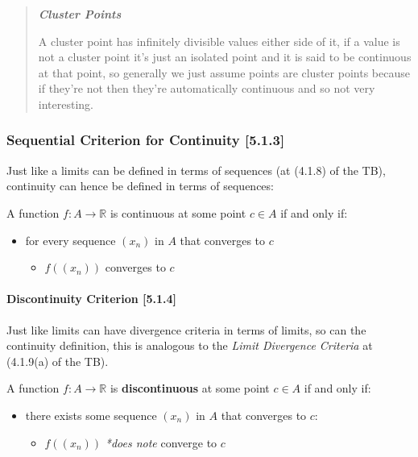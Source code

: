 \documentclass[class=article, crop=false]{standalone}
\begin{document}
\begin{quote}
\textbf{\emph{Cluster Points}}

A cluster point has infinitely divisible values either side of it, if a
value is not a cluster point it's just an isolated point and it is said
to be continuous at that point, so generally we just assume points are
cluster points because if they're not then they're automatically
continuous and so not very interesting.
\end{quote}

\hypertarget{header-n3914}{%
\subsubsection{Sequential Criterion for Continuity
{[}5.1.3{]}}\label{header-n3914}}

Just like a limits can be defined in terms of sequences (at (4.1.8) of
the TB), continuity can hence be defined in terms of sequences:

A function \(f: A \rightarrow \mathbb{R}\) is continuous at some point
\(c \in A \) if and only if:

\begin{itemize}
\item
  for every sequence \((x_n)\) in \(A\) that converges to \(c\)

  \begin{itemize}
  \item
    \(f\left(\left( x_n \right) \right)\) converges to \(c\) 
  \end{itemize}
\end{itemize}

\hypertarget{header-n3923}{%
\paragraph{Discontinuity Criterion {[}5.1.4{]}}\label{header-n3923}}

Just like limits can have divergence criteria in terms of limits, so can
the continuity definition, this is analogous to the \emph{Limit
Divergence Criteria} at (4.1.9(a) of the TB).

A function \(f: A \rightarrow \mathbb{R}\) is \textbf{discontinuous} at
some point \(c \in A \) if and only if:

\begin{itemize}
\item
  there exists some sequence \((x_n)\) in \(A\) that converges to \(c\):

  \begin{itemize}
  \item
    \(f\left(\left( x_n \right) \right)\) \emph{*does note} converge to
    \(c\) 
  \end{itemize}
\end{itemize}
\end{document}
